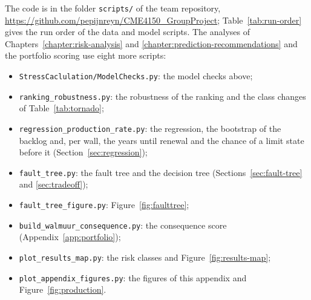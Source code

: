 The code is in the folder \texttt{scripts/} of the team repository,
\url{https://github.com/pepijnreyn/CME4150_GroupProject}; Table~\ref{tab:run-order} gives the run order of the data
and model scripts. The analyses of Chapters~\ref{chapter:risk-analysis} and
\ref{chapter:prediction-recommendations} and the portfolio scoring use eight
more scripts:
\begin{itemize}
  \item \texttt{StressCaclulation/ModelChecks.py}: the model checks above;
  \item \texttt{ranking\_robustness.py}: the robustness of the ranking and the
    class changes of Table~\ref{tab:tornado};
  \item \texttt{regression\_production\_rate.py}: the regression, the bootstrap
    of the backlog and, per wall, the years until renewal and the chance of a
    limit state before it (Section~\ref{sec:regression});
  \item \texttt{fault\_tree.py}: the fault tree and the decision tree
    (Sections~\ref{sec:fault-tree} and \ref{sec:tradeoff});
  \item \texttt{fault\_tree\_figure.py}: Figure~\ref{fig:faulttree};
  \item \texttt{build\_walmuur\_consequence.py}: the consequence score
    (Appendix~\ref{app:portfolio});
  \item \texttt{plot\_results\_map.py}: the risk classes and
    Figure~\ref{fig:results-map};
  \item \texttt{plot\_appendix\_figures.py}: the figures of this appendix and
    Figure~\ref{fig:production}.
\end{itemize}

